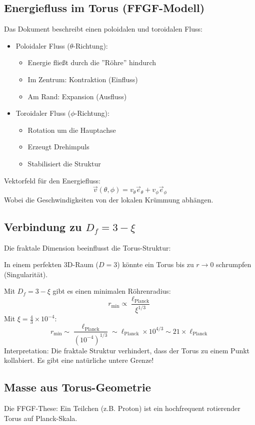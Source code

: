 	\subsection{Energiefluss im Torus (FFGF-Modell)}
	Das Dokument beschreibt einen poloidalen und toroidalen Fluss:
	\begin{itemize}
		\item Poloidaler Fluss (\( \theta \)-Richtung):
		\begin{itemize}
			\item Energie fließt durch die ''Röhre'' hindurch
			\item Im Zentrum: Kontraktion (Einfluss)
			\item Am Rand: Expansion (Ausfluss)
		\end{itemize}
		\item Toroidaler Fluss (\( \phi \)-Richtung):
		\begin{itemize}
			\item Rotation um die Hauptachse
			\item Erzeugt Drehimpuls
			\item Stabilisiert die Struktur
		\end{itemize}
	\end{itemize}
	
	Vektorfeld für den Energiefluss:
	\[
	\vec{v}(\theta, \phi) = v_\theta \vec{e}_\theta + v_\phi \vec{e}_\phi
	\]
	Wobei die Geschwindigkeiten von der lokalen Krümmung abhängen.
	
	\subsection{Verbindung zu \( D_f = 3 - \xi \)}
	Die fraktale Dimension beeinflusst die Torus-Struktur:
	
	In einem perfekten 3D-Raum (\( D = 3 \)) könnte ein Torus bis zu \( r \to 0 \) schrumpfen (Singularität).
	
	Mit \( D_f = 3 - \xi \) gibt es einen minimalen Röhrenradius:
	\[
	r_{\text{min}} \propto \frac{\ell_{\text{Planck}}}{\xi^{1/3}}
	\]
	Mit \( \xi = \frac{4}{3} \times 10^{-4} \):
	\[
	r_{\text{min}} \sim \frac{\ell_{\text{Planck}}}{(10^{-4})^{1/3}} \sim \ell_{\text{Planck}} \times 10^{4/3} \sim 21 \times \ell_{\text{Planck}}
	\]
	Interpretation: Die fraktale Struktur verhindert, dass der Torus zu einem Punkt kollabiert. Es gibt eine natürliche untere Grenze!
	
	\subsection{Masse aus Torus-Geometrie}
	Die FFGF-These: Ein Teilchen (z.B. Proton) ist ein hochfrequent rotierender Torus auf Planck-Skala.
	
